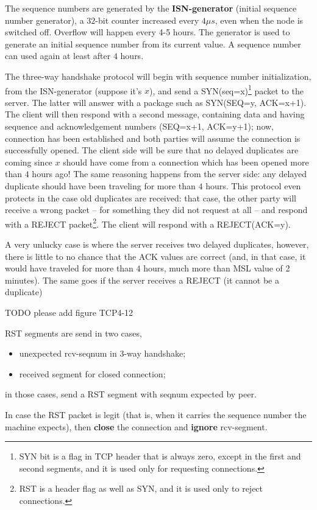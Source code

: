 \documentclass[a4paper, 11pt]{report}
\begin{document}
The sequence numbers are generated by the \textbf{ISN-generator} (initial
sequence number generator), a $32$-bit counter increased every $4\mu s$, even
when the node is switched off. Overflow will happen every 4-5 hours. The
generator is used to generate an initial sequence number from its current
value. A sequence number can used again at least after $4$ hours.

The three-way handshake protocol will begin with sequence number
initialization, from the ISN-generator (suppose it's $x$), and send a
SYN(seq=x)\footnote{SYN bit is a flag in TCP header that is always zero, except
in the first and second segments, and it is used only for requesting
connections.} packet to the server. The latter will answer with a package such
as SYN(SEQ=y, ACK=x+1). The client will then respond with a second message,
containing data and having sequence and acknowledgement numbers (SEQ=x+1,
ACK=y+1); now, connection has been established and both parties will assume the
connection is successfully opened. The client side will be sure that no delayed
duplicates are coming since $x$ should have come from a connection which has
been opened more than $4$ hours ago! The same reasoning happens from the server
side: any delayed duplicate should have been traveling for more than $4$ hours.
This protocol even protects in the case old duplicates are received: that case,
the other party will receive a wrong packet \--- for something they did not
request at all \--- and respond with a REJECT packet\footnote{RST is a header
flag as well as SYN, and it is used only to reject connections.}. The client
will respond with a REJECT(ACK=y).

A very unlucky case is where the server receives two delayed duplicates,
however, there is little to no chance that the ACK values are correct (and, in
that case, it would have traveled for more than $4$ hours, much more than MSL
value of 2 minutes). The same goes if the server receives a REJECT (it cannot
be a duplicate)

TODO please add figure TCP4-12

RST segments are send in two cases,
\begin{itemize}
	\item unexpected rcv-seqnum in 3-way handshake;
    \item received segment for closed connection;
\end{itemize}
in those cases, send a RST segment with seqnum expected by peer.

In case the RST packet is legit (that is, when it carries the sequence number
the machine expects), then \textbf{close} the connection and \textbf{ignore}
rcv-segment.
\end{document}
